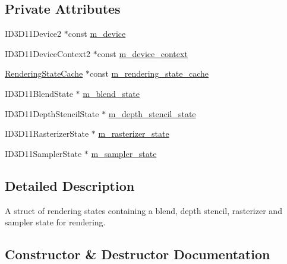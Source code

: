 \subsection*{Private Attributes}
\begin{DoxyCompactItemize}
\item 
I\+D3\+D11\+Device2 $\ast$const \hyperlink{structmage_1_1_rendering_state_a7985712bda141bfac079d4fb6d85cfec}{m\+\_\+device}
\item 
I\+D3\+D11\+Device\+Context2 $\ast$const \hyperlink{structmage_1_1_rendering_state_a13e46783f38a60fe032dc2aad708ec48}{m\+\_\+device\+\_\+context}
\item 
\hyperlink{structmage_1_1_rendering_state_cache}{Rendering\+State\+Cache} $\ast$const \hyperlink{structmage_1_1_rendering_state_a8d422a14392f89eec1ece2d917511168}{m\+\_\+rendering\+\_\+state\+\_\+cache}
\item 
I\+D3\+D11\+Blend\+State $\ast$ \hyperlink{structmage_1_1_rendering_state_ab08e5f63a1bd463ce6029eaaf3526ae4}{m\+\_\+blend\+\_\+state}
\item 
I\+D3\+D11\+Depth\+Stencil\+State $\ast$ \hyperlink{structmage_1_1_rendering_state_a2428412ad160c0d4dd2538c3a9cc863f}{m\+\_\+depth\+\_\+stencil\+\_\+state}
\item 
I\+D3\+D11\+Rasterizer\+State $\ast$ \hyperlink{structmage_1_1_rendering_state_a63b8c00bd0e2e1c56bd2a42f269733a8}{m\+\_\+rasterizer\+\_\+state}
\item 
I\+D3\+D11\+Sampler\+State $\ast$ \hyperlink{structmage_1_1_rendering_state_a88c58f587b9670d662aef5a3a52fa38d}{m\+\_\+sampler\+\_\+state}
\end{DoxyCompactItemize}


\subsection{Detailed Description}
A struct of rendering states containing a blend, depth stencil, rasterizer and sampler state for rendering. 

\subsection{Constructor \& Destructor Documentation}
\hypertarget{structmage_1_1_rendering_state_acd2fe8a62bbd9c40e4b6d7dbee710223}{}\label{structmage_1_1_rendering_state_acd2fe8a62bbd9c40e4b6d7dbee710223} 
